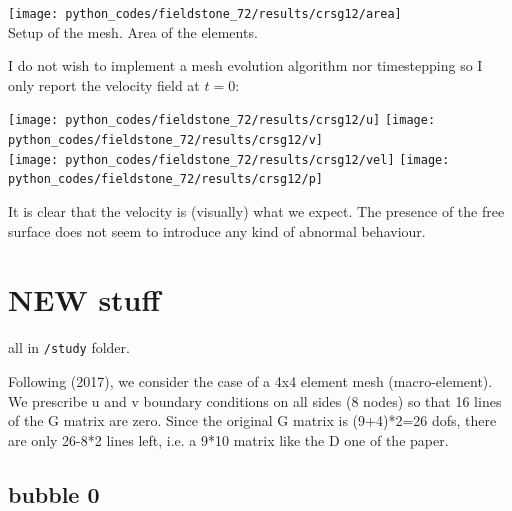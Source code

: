\begin{center}
\texttt{[image: python\_codes/fieldstone\_72/results/crsg12/area]}\\
{\captionfont Setup of the mesh. Area of the elements.}
\end{center}

I do not wish to implement a mesh evolution algorithm nor timestepping so
I only report the velocity field at $t=0$:

\begin{center}
\texttt{[image: python\_codes/fieldstone\_72/results/crsg12/u]}
\texttt{[image: python\_codes/fieldstone\_72/results/crsg12/v]}\\
\texttt{[image: python\_codes/fieldstone\_72/results/crsg12/vel]}
\texttt{[image: python\_codes/fieldstone\_72/results/crsg12/p]}
\end{center}

It is clear that the velocity is (visually) what we expect. The presence of the free surface 
does not seem to introduce any kind of abnormal behaviour. 


\newpage
\section*{NEW stuff}

all in {\tt /study} folder.

Following \textcite{lami17} (2017), we consider the case of a 4x4 element mesh (macro-element).
We prescribe u and v boundary conditions on all sides (8 nodes) so that
16 lines of the G matrix are zero. Since the original G matrix is (9+4)*2=26 dofs, 
there are only 26-8*2 lines left, i.e. a 9*10 matrix like the D one of the paper.

\subsection*{bubble 0}


